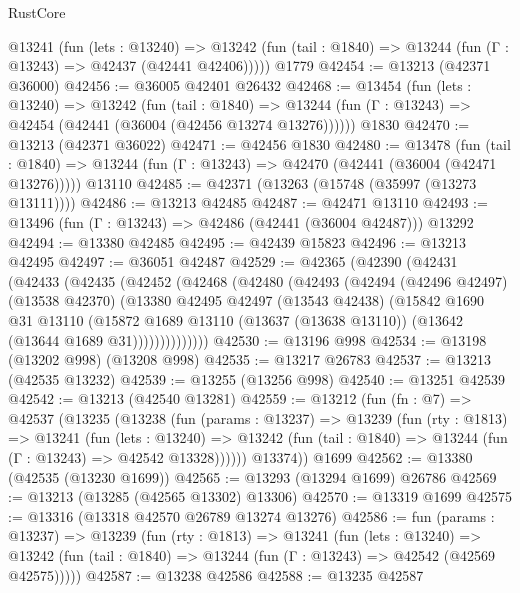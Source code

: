 \begin{lexlean}{RustCore}
\begin{coremodule}
    @13241
      (fun (lets : @13240) =>
      @13242 (fun (tail : @1840) => @13244 (fun (Γ : @13243) => @42437 (@42441 @42406)))))
    @1779
@42454 := @13213 (@42371 @36000)
@42456 := @36005 @42401 @26432
@42468 := @13454
    (fun (lets : @13240) =>
    @13242
      (fun (tail : @1840) =>
      @13244 (fun (Γ : @13243) => @42454 (@42441 (@36004 (@42456 @13274 @13276))))))
    @1830
@42470 := @13213 (@42371 @36022)
@42471 := @42456 @1830
@42480 := @13478
    (fun (tail : @1840) => @13244 (fun (Γ : @13243) => @42470 (@42441 (@36004 (@42471 @13276)))))
    @13110
@42485 := @42371 (@13263 (@15748 (@35997 (@13273 @13111))))
@42486 := @13213 @42485
@42487 := @42471 @13110
@42493 := @13496 (fun (Γ : @13243) => @42486 (@42441 (@36004 @42487))) @13292
@42494 := @13380 @42485
@42495 := @42439 @15823
@42496 := @13213 @42495
@42497 := @36051 @42487
@42529 := @42365
    (@42390
      (@42431
        (@42433
          (@42435
            (@42452
              (@42468
                (@42480
                  (@42493
                    (@42494
                      (@42496 @42497)
                      (@13538 @42370)
                      (@13380
                        @42495
                        @42497
                        (@13543 @42438)
                        (@15842
                          @1690
                          @31
                          @13110
                          (@15872
                            @1689
                            @13110
                            (@13637 (@13638 @13110))
                            (@13642 (@13644 @1689 @31))))))))))))))
@42530 := @13196 @998
@42534 := @13198 (@13202 @998) (@13208 @998)
@42535 := @13217 @26783
@42537 := @13213 (@42535 @13232)
@42539 := @13255 (@13256 @998)
@42540 := @13251 @42539
@42542 := @13213 (@42540 @13281)
@42559 := @13212
    (fun (fn : @7) =>
    @42537
      (@13235
        (@13238
          (fun (params : @13237) =>
          @13239
            (fun (rty : @1813) =>
            @13241
              (fun (lets : @13240) =>
              @13242 (fun (tail : @1840) => @13244 (fun (Γ : @13243) => @42542 @13328))))))
        @13374))
    @1699
@42562 := @13380 (@42535 (@13230 @1699))
@42565 := @13293 (@13294 @1699) @26786
@42569 := @13213 (@13285 (@42565 @13302) @13306)
@42570 := @13319 @1699
@42575 := @13316 (@13318 @42570 @26789 @13274 @13276)
@42586 := fun (params : @13237) =>
  @13239
    (fun (rty : @1813) =>
    @13241
      (fun (lets : @13240) =>
      @13242 (fun (tail : @1840) => @13244 (fun (Γ : @13243) => @42542 (@42569 @42575)))))
@42587 := @13238 @42586
@42588 := @13235 @42587

\end{coremodule}
\end{lexlean}
